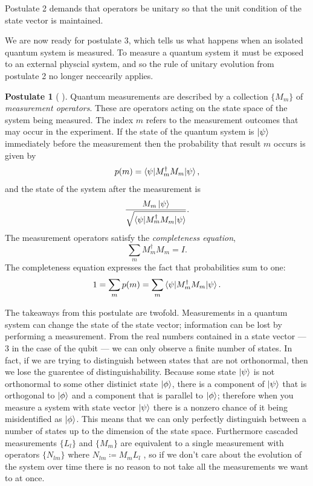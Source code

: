 \documentclass[12pt,twoside]{reedthesis}
\theoremstyle{plain}   %
\theoremstyle{definition}
\newtheorem{post}{Postulate}[section]
\theoremstyle{remark}
\numberwithin{equation}{section}
\begin{document}
   Postulate 2 demands that operators be unitary so that the unit condition of the state vector is maintained. \par
   We are now ready for postulate 3, which tells us what happens when an isolated quantum system is measured.
   To measure a quantum system it must be exposed to an external physcial system, and so the rule of unitary evolution from postulate 2 no longer neccearily applies.
   \begin{post}[{ \cite[2.2.3]{nielsen2010} }]
     Quantum measurements are described by a collection $\{M_m\}$ of \emph{measurement operators}.
     These are operators acting on the state space of the system being measured.
     The index $m$ refers to the measurement outcomes that may occur in the experiment.
     If the state of the quantum system is $\ket{\psi}$ immediately before the measurement then the probability that result $m$ occurs is given by
     \[ p(m) = \braket{ \psi | M_m^\dag M_m | \psi},\]
     and the state of the system after the measurement is
     \[ \dfrac{M_m \ket{\psi}}{\sqrt{\braket{\psi | M_m^\dag M_m | \psi}}}.\]
     The measurement operators satisfy the \emph{completeness equation},
     \[ \sum_m M_m^\dag M_m = I.\]
     The completeness equation expresses the fact that probabilities sum to one:
     \[ 1 = \sum_m p(m) = \sum_m \braket{\psi | M_m^\dag M_m | \psi}.\]
   \end{post}
   The takeaways from this postulate are twofold. Measurements in a quantum system can change the state of the state vector; information can be lost by performing a measurement.
   From the real numbers contained in a state vector --- 3 in the case of the qubit --- we can only observe a finite number of states.
   In fact, if we are trying to distinguish between states that are not orthonormal, then we lose the guarentee of distinguishability.
   Because some state $\ket{\psi}$ is not orthonormal to some other distinict state $\ket{\phi}$, there is a component of $\ket{\psi}$ that is orthogonal to $\ket{\phi}$ and a component
   that is parallel to $\ket{\phi}$; therefore when you measure a system with state vector $\ket{\psi}$ there is a nonzero chance of it being misidentified as $\ket{\phi}$.
   This means that we can only perfectly distinguish between a number of states up to the dimension of the state space.
   Furthermore cascaded measurements $\{L_l \}$ and $\{M_m\}$ are equivalent to a single measurement with operators $\{N_{lm}\}$ where $N_{lm} \coloneq M_m L_l$ \cite[2.57]{nielsen2010},
   so if we don't care about the evolution of the system over time there is no reason to not take all the measurements we want to at once. \par
\end{document}
